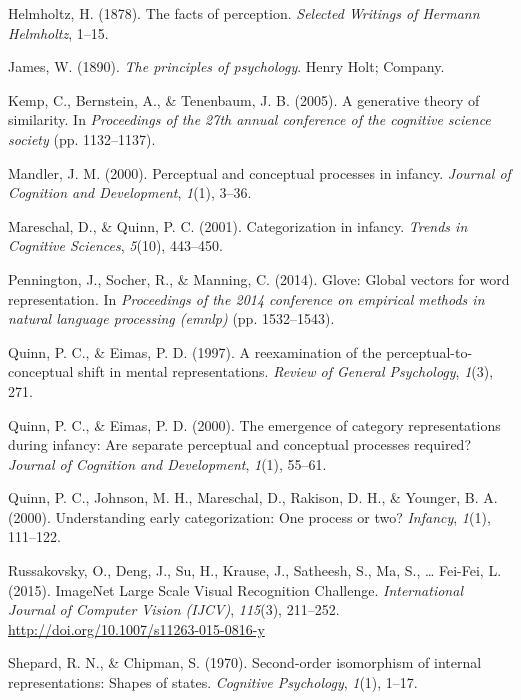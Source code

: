 \documentclass[10pt, letterpaper]{article}
\begin{document}
\hypertarget{ref-helmholtz1878facts}{}
Helmholtz, H. (1878). The facts of perception. \emph{Selected Writings
of Hermann Helmholtz}, 1--15.

\hypertarget{ref-james2013principles}{}
James, W. (1890). \emph{The principles of psychology}. Henry Holt;
Company.

\hypertarget{ref-kemp2005generative}{}
Kemp, C., Bernstein, A., \& Tenenbaum, J. B. (2005). A generative theory
of similarity. In \emph{Proceedings of the 27th annual conference of the
cognitive science society} (pp. 1132--1137).

\hypertarget{ref-mandler2000perceptual}{}
Mandler, J. M. (2000). Perceptual and conceptual processes in infancy.
\emph{Journal of Cognition and Development}, \emph{1}(1), 3--36.

\hypertarget{ref-mareschal2001categorization}{}
Mareschal, D., \& Quinn, P. C. (2001). Categorization in infancy.
\emph{Trends in Cognitive Sciences}, \emph{5}(10), 443--450.

\hypertarget{ref-pennington2014glove}{}
Pennington, J., Socher, R., \& Manning, C. (2014). Glove: Global vectors
for word representation. In \emph{Proceedings of the 2014 conference on
empirical methods in natural language processing (emnlp)} (pp.
1532--1543).

\hypertarget{ref-quinn1997reexamination}{}
Quinn, P. C., \& Eimas, P. D. (1997). A reexamination of the
perceptual-to-conceptual shift in mental representations. \emph{Review
of General Psychology}, \emph{1}(3), 271.

\hypertarget{ref-quinn2000emergence}{}
Quinn, P. C., \& Eimas, P. D. (2000). The emergence of category
representations during infancy: Are separate perceptual and conceptual
processes required? \emph{Journal of Cognition and Development},
\emph{1}(1), 55--61.

\hypertarget{ref-quinn2000understanding}{}
Quinn, P. C., Johnson, M. H., Mareschal, D., Rakison, D. H., \& Younger,
B. A. (2000). Understanding early categorization: One process or two?
\emph{Infancy}, \emph{1}(1), 111--122.

\hypertarget{ref-ILSVRC15}{}
Russakovsky, O., Deng, J., Su, H., Krause, J., Satheesh, S., Ma, S.,
\ldots{} Fei-Fei, L. (2015). ImageNet Large Scale Visual Recognition
Challenge. \emph{International Journal of Computer Vision (IJCV)},
\emph{115}(3), 211--252. \url{http://doi.org/10.1007/s11263-015-0816-y}

\hypertarget{ref-shepard1970second}{}
Shepard, R. N., \& Chipman, S. (1970). Second-order isomorphism of
internal representations: Shapes of states. \emph{Cognitive Psychology},
\emph{1}(1), 1--17.
\end{document}
